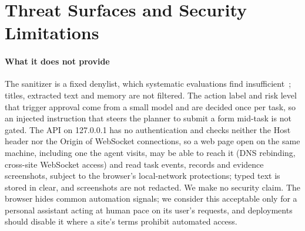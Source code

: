 \section{Threat Surfaces and Security Limitations}
\label{sec:sec-full}



\paragraph{What it does not provide} The sanitizer is a fixed denylist, which systematic evaluations find insufficient~\cite{liu2024formalizing}; titles, extracted text and memory are not filtered. The action label and risk level that trigger approval come from a small model and are decided once per task, so an injected instruction that steers the planner to submit a form mid-task is not gated. The API on 127.0.0.1 has no authentication and checks neither the Host header nor the Origin of WebSocket connections, so a web page open on the same machine, including one the agent visits, may be able to reach it (DNS rebinding, cross-site WebSocket access) and read task events, records and evidence screenshots, subject to the browser's local-network protections; typed text is stored in clear, and screenshots are not redacted. We make no security claim. The browser hides common automation signals; we consider this acceptable only for a personal assistant acting at human pace on its user's requests, and deployments should disable it where a site's terms prohibit automated access.
